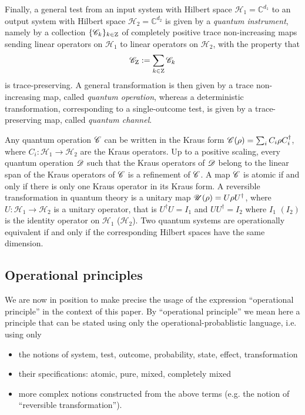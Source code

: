 \documentclass[12pt,aps,pra,showpacs,groupedaddress]{revtex4-1}
\def\spc #1{{\mathscr #1}}
\def\Cmplx{\mathbb C}
\begin{document}
Finally, a general test from an input system with Hilbert space $\spc H_1= \Cmplx^{d_1}$
to an output system with Hilbert space $\spc H_2 = \Cmplx^{d_2} $ is given by a \emph{quantum instrument}, namely by a collection $\{\mathscr C_k\}_{k \in {\rm Z}}$ of  completely positive trace non-increasing maps sending linear operators on
$\spc H_1$ to linear operators on $\spc H_2$, with the property that 
\begin{equation*}
\tC_\rZ  : = \sum_{k \in \rZ}  \tC_k  
\end{equation*}   
is trace-preserving.  A general transformation is then given by a  trace non-increasing map, called \emph{quantum operation}, whereas a deterministic transformation, corresponding to a single-outcome test, is given by a trace-preserving map, called \emph{quantum channel}.    

Any quantum operation $\mathscr C$ can be written in the Kraus form $\mathscr C
(\rho) = \sum_i C_i \rho C_i^\dag$, where $C_i : \spc H_1 \to \spc H_2$ are the Kraus operators.  Up
to a positive scaling, every quantum operation $\mathscr D $ such that the Kraus operators of $\mathscr D$ belong
to the linear span of the Kraus operators of $\mathscr C$ is a refinement of $\mathscr C$.  A map $\mathscr C$ is atomic
if and only if there is only one Kraus operator in its Kraus form.  A reversible transformation in
quantum theory is a unitary map $\mathscr U (\rho ) = U \rho U^\dag$, where $U: \spc H_1 \to \spc H_2$ is a
unitary operator, that is $U^\dag U = I_1$ and $U U^\dag = I_2$ where $I_1$ $(I_2)$ is the identity
operator on $\spc H_1$ ($\spc H_2$).  Two quantum systems are operationally equivalent if and only
if the corresponding Hilbert spaces have the same dimension.



\subsection{Operational principles}

We are now in position to make precise the usage of the expression ``operational principle'' in the
context of this paper.  By ``operational principle'' we mean here a principle that can be stated
using only the operational-probablistic language, i.e. using only 
\begin{itemize}
\item the notions of system, test, outcome,
probability, state, effect, transformation
\item their specifications: atomic, pure, mixed, completely mixed
\item more complex notions constructed from the above terms
(e.g. the notion of ``reversible transformation'').  
\end{itemize}
\end{document}
